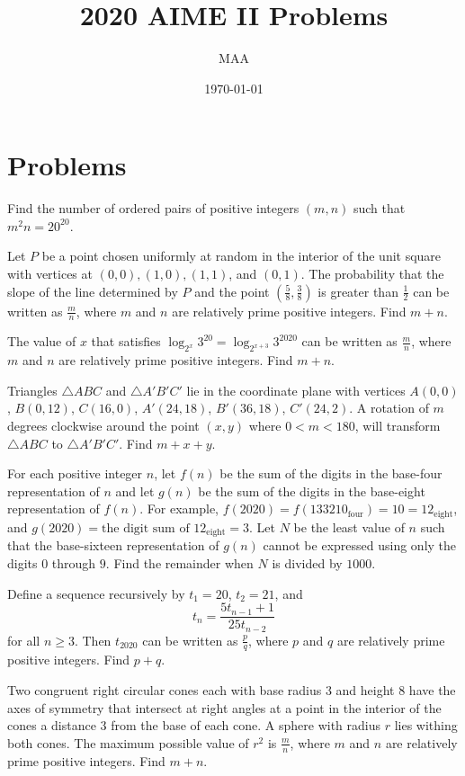 \documentclass{article}%
\title{2020 AIME II Problems}%
\author{MAA}%
\date{\today}%
\begin{document}
%
\normalsize%
\maketitle%
\section{Problems}%
\label{sec:Problems}%
Find the number of ordered pairs of positive integers $(m,n)$ such that ${m^2n = 20 ^{20}}$.

Let $P$ be a point chosen uniformly at random in the interior of the unit square with vertices at $(0,0), (1,0), (1,1)$, and $(0,1)$. The probability that the slope of the line determined by $P$ and the point $\left(\frac58, \frac38 \right)$ is greater than $\frac12$ can be written as $\frac{m}{n}$, where $m$ and $n$ are relatively prime positive integers. Find $m+n$.

The value of $x$ that satisfies $\log_{2^x} 3^{20} = \log_{2^{x+3}} 3^{2020}$ can be written as $\frac{m}{n}$, where $m$ and $n$ are relatively prime positive integers. Find $m+n$.

Triangles $\triangle ABC$ and $\triangle A'B'C'$ lie in the coordinate plane with vertices $A(0,0)$, $B(0,12)$, $C(16,0)$, $A'(24,18)$, $B'(36,18)$, $C'(24,2)$. A rotation of $m$ degrees clockwise around the point $(x,y)$ where $0<m<180$, will transform $\triangle ABC$ to $\triangle A'B'C'$. Find $m+x+y$.

For each positive integer $n$, let $f(n)$ be the sum of the digits in the base-four representation of $n$ and let $g(n)$ be the sum of the digits in the base-eight representation of $f(n)$. For example, $f(2020) = f(133210_{\text{four}}) = 10 = 12_{\text{eight}}$, and $g(2020) = \text{the digit sum of }12_{\text{eight}} = 3$. Let $N$ be the least value of $n$ such that the base-sixteen representation of $g(n)$ cannot be expressed using only the digits $0$ through $9$. Find the remainder when $N$ is divided by $1000$.

Define a sequence recursively by $t_1 = 20$, $t_2 = 21$, and\[t_n = \frac{5t_{n-1}+1}{25t_{n-2}}\]for all $n \ge 3$. Then $t_{2020}$ can be written as $\frac{p}{q}$, where $p$ and $q$ are relatively prime positive integers. Find $p+q$.

Two congruent right circular cones each with base radius $3$ and height $8$ have the axes of symmetry that intersect at right angles at a point in the interior of the cones a distance $3$ from the base of each cone. A sphere with radius $r$ lies withing both cones. The maximum possible value of $r^2$ is $\frac{m}{n}$, where $m$ and $n$ are relatively prime positive integers. Find $m+n$.
\end{document}
